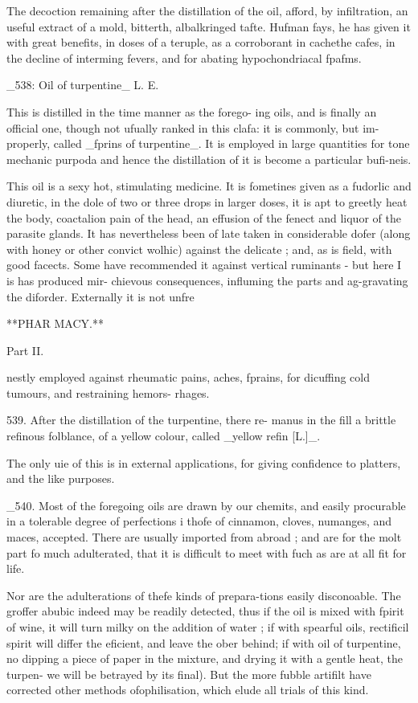 \documentclass{article}
\begin{document}
The decoction remaining after the distillation of the oil, afford, by infiltration, an useful extract of a mold, bitterth, albalkringed tafte. Hufman fays, he has given it with great benefits, in doses of a teruple, as a corroborant in cachethe cafes, in the decline of interming fevers, and for abating hypochondriacal fpafms.

\_538: Oil of turpentine\_ L. E.

This is distilled in the time manner as the forego- ing oils, and is finally an official one, though not ufually ranked in this clafa: it is commonly, but im- properly, called \_fprins of turpentine\_. It is employed in large quantities for tone mechanic purpoda and hence the distillation of it is become a particular bufi-neis.

This oil is a sexy hot, stimulating medicine. It is fometines given as a fudorlic and diuretic, in the dole of two or three drops in larger doses, it is apt to greetly heat the body, coactalion pain of the head, an effusion of the fenect and liquor of the parasite glands. It has nevertheless been of late taken in considerable dofer (along with honey or other convict wolhic) against the delicate ; and, as is field, with good facects. Some have recommended it against vertical ruminants - but here I is has produced mir- chievous consequences, influming the parts and ag-gravating the diforder. Externally it is not unfre

**PHAR MACY.**

Part II.

nestly employed against rheumatic pains, aches, fprains, for dicuffing cold tumours, and restraining hemors- rhages.

539. After the distillation of the turpentine, there re- manus in the fill a brittle refinous folblance, of a yellow colour, called \_yellow refin [L.]\_.

The only uie of this is in external applications, for giving confidence to platters, and the like purposes.

\_540. Most of the foregoing oils are drawn by our chemits, and easily procurable in a tolerable degree of perfections i thofe of cinnamon, cloves, numanges, and maces, accepted. There are usually imported from abroad ; and are for the molt part fo much adulterated, that it is difficult to meet with fuch as are at all fit for life.

Nor are the adulterations of thefe kinds of prepara-tions easily disconoable. The groffer abubic indeed may be readily detected, thus if the oil is mixed with fpirit of wine, it will turn milky on the addition of water ; if with spearful oils, rectificil spirit will differ the eficient, and leave the ober behind; if with oil of turpentine, no dipping a piece of paper in the mixture, and drying it with a gentle heat, the turpen- we will be betrayed by its final). But the more fubble artifilt have corrected other methods ofophilisation, which elude all trials of this kind.
\end{document}
